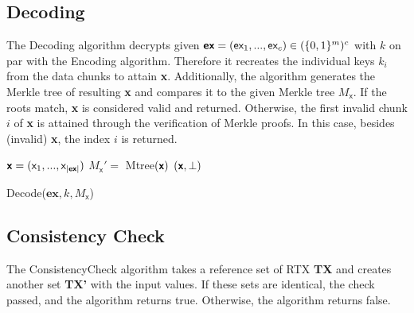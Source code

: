\documentclass{cacthesis}
\begin{document}
        \subsection{Decoding}
        The \textsf{Decoding} algorithm decrypts given $\textsf{\textbf{ex}} = (\textsf{ex}_1, ..., \textsf{ex}_c) \in (\{0,1\}^m)^c$ with $k$ on par with the \textsf{Encoding} algorithm. Therefore it recreates the individual keys $k_i$ from the data chunks to attain \textsf{\textbf{x}}. Additionally, the algorithm generates the Merkle tree of resulting \textsf{\textbf{x}} and compares it to the given Merkle tree  $M_\textsf{x}$. If the roots match, \textsf{\textbf{x}} is considered valid and returned. Otherwise, the first invalid chunk $i$ of \textsf{\textbf{x}} is attained through the verification of Merkle proofs. In this case, besides (invalid) \textsf{\textbf{x}},  the index $i$ is returned.
        \begin{center}
        \begin{minipage}[t]{4in}
            \begin{algorithm}[H]
                 $\textsf{\textbf{x}} = (\textsf{x}_1,..., \textsf{x}_{|\textsf{\textbf{ex}}|})$\;
                 $M_\textsf{x}' = $ \textsf{Mtree}$(\textsf{\textbf{x}})$\;
                \Return $(\textsf{\textbf{x}}, \perp)$\;
                \caption{\textsf{Decode($\textbf{ex}, k, M_\textsf{x}$)}}
            \end{algorithm}
        \end{minipage}
        \end{center}
        
        \subsection{Consistency Check}
        The \textsf{ConsistencyCheck} algorithm takes a reference set of RTX \textbf{TX} and creates another set \textbf{TX'} with the input values. If these sets are identical, the check passed, and the algorithm returns \textsf{true}. Otherwise, the algorithm returns \textsf{false}.
        
\end{document}
